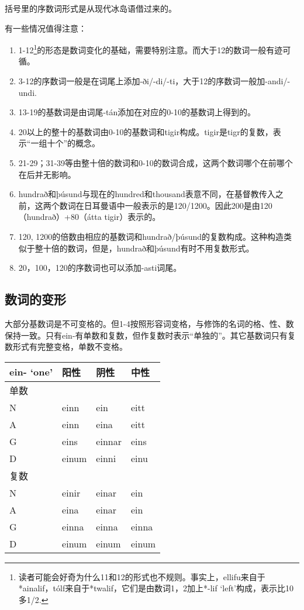 括号里的序数词形式是从现代冰岛语借过来的。

有一些情况值得注意：
\begin{enumerate}
    \item
          1-12\footnote{读者可能会好奇为什么11和12的形式也不规则。事实上，ellifu来自于*ainalif，tólf来自于*twalif，它们是由数词1，2加上*-lif
              `left'构成，表示比10多1/2.}的形态是数词变化的基础，需要特别注意。而大于12的数词一般有迹可循。
    \item
          3-12的序数词一般是在词尾上添加-ði/-di/-ti，大于12的序数词一般加-andi/-undi.
    \item
          13-19的基数词是由词尾-tán添加在对应的0-10的基数词上得到的。
    \item
          20以上的整十的基数词由0-10的基数词和tigir构成。tigir是tigr的复数，表示``一组十个''的概念。
    \item
          21-29；31-39等由整十倍的数词和0-10的数词合成，这两个数词哪个在前哪个在后并无影响。
    \item
          hundrað和þúsund与现在的hundred和thousand表意不同，在基督教传入之前，这两个数词在日耳曼语中一般表示的是120/1200。因此200是由120（hundrað）+80（átta
          tigir）表示的。
    \item
          120, 1200的倍数由相应的基数词和hundrað/þúsund的复数构成。这种构造类似于整十倍的数词，但是，hundrað和þúsund有时不用复数形式。
    \item
          20，100，120的序数词也可以添加-asti词尾。
\end{enumerate}

\subsection{数词的变形}

大部分基数词是不可变格的。但1-4按照形容词变格，与修饰的名词的格、性、数保持一致。只有ein-有单数和复数，但作复数时表示``单独的''。其它基数词只有复数形式有完整变格，单数不变格。
\begin{longtable}{llll}
    \toprule
    ein- `one‌' & 阳性    & 阴性     & 中性    \\
    \midrule
    \endhead
    \bottomrule
    \endfoot
    单数         &       &        &       \\
    N          & einn  & ein    & eitt  \\
    A          & einn  & eina   & eitt  \\
    G          & eins  & einnar & eins  \\
    D          & einum & einni  & einu  \\
    复数         &       &        &       \\
    N          & einir & einar  & ein   \\
    A          & eina  & einar  & ein   \\
    G          & einna & einna  & einna \\
    D          & einum & einum  & einum \\
\end{longtable}


